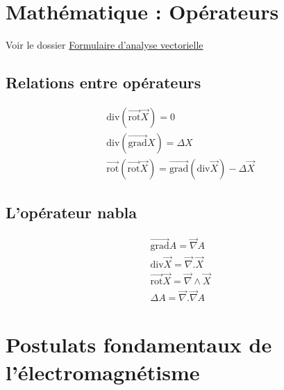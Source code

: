 \newpage 
\section{Mathématique : Opérateurs} %
\label{sec:Mathématique : Opérateurs}

Voir le dossier \href{http://moodle.speit.sjtu.edu.cn/pluginfile.php/37446/mod_resource/content/1/De_Formulaire_analyse_vectorielle_P2021.pdf}{Formulaire d'analyse vectorielle}

\subsection{Relations entre opérateurs} %
\label{sub:Relations entre opérateurs}

\begin{gather}
  \mathrm{div} (\overrightarrow{\mathrm{rot}} \overrightarrow{X}) = 0 \\ 
  \mathrm{div} ( \overrightarrow{\mathrm{grad}} X) = \Delta X \\ 
  \overrightarrow{\mathrm{rot}} ( \overrightarrow{\mathrm{rot}} \overrightarrow{X}) = \overrightarrow{\mathrm{grad}}(\mathrm{div} \overrightarrow{X}) - \Delta \overrightarrow{X}
\end{gather}

\subsection{L'opérateur nabla} %
\label{sub:L'opérateur nabla}

\begin{gather}
  \overrightarrow{\mathrm{grad}} A = \overrightarrow{\nabla} A \\ 
  \mathrm{div} \overrightarrow{X} = \overrightarrow{\nabla}. \overrightarrow{X} \\ 
  \overrightarrow{\mathrm{rot}} \overrightarrow{X} = \overrightarrow{\nabla} \wedge \overrightarrow{X}\\ 
  \Delta A = \overrightarrow{\nabla} . \overrightarrow{\nabla} A
\end{gather}

\newpage
\section{Postulats fondamentaux de l'électromagnétisme} %
\label{sec:Postulats fondamentaux de l'électromagnétisme}

